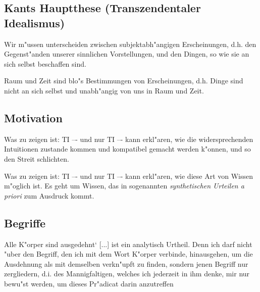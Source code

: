 \documentclass[emulatestandardclasses]{scrartcl}
\begin{document}
\subsection{Kants Hauptthese (Transzendentaler Idealismus)}

\begin{description}[leftmargin=!,labelwidth=\widthof{\bfseries ii}]
  \item[i] Wir m"ussen unterscheiden zwischen subjektabh"angigen Erscheinungen, d.h. den Gegenst"anden unserer sinnlichen Vorstellungen, und den Dingen, so wie sie an sich selbst beschaffen sind.
  \item[ii] Raum und Zeit sind blo"s Bestimmungen von Erscheinungen, d.h. Dinge sind nicht an sich selbst und unabh"angig von uns in Raum und Zeit.
\end{description}

\subsection{Motivation}

\begin{description}[leftmargin=!,labelwidth=\widthof{\bfseries Erkenntnistheorie}]
  \item[Metaphysik] Was zu zeigen ist: TI –- und nur TI –- kann erkl"aren, wie die widersprechenden Intuitionen zustande kommen und kompatibel gemacht werden k"onnen, und so den Streit schlichten.
  \item[Erkenntnistheorie] Was zu zeigen ist: TI –- und nur TI –- kann erkl"aren, wie diese Art von Wissen m"oglich ist. Es geht um Wissen, das in sogenannten \emph{synthetischen Urteilen a priori} zum Ausdruck kommt.
\end{description}


\subsection{Begriffe}

\begin{description}[leftmargin=!,labelwidth=\widthof{\bfseries ii}]
  \item[Was hei"st es, dass der Begriff des Unverheiratetseins in dem
des Junggesellen enthalten ist?] Alle K"orper sind ausgedehnt‘ [...] ist ein analytisch Urtheil. Denn ich darf nicht "uber den Begriff, den ich mit dem Wort K"orper verbinde, hinausgehen, um die Ausdehnung als mit demselben verkn"upft zu finden, sondern jenen Begriff nur zergliedern, d.i. des Mannigfaltigen, welches ich jederzeit in ihm denke, mir nur bewu"st werden, um dieses Pr"adicat darin anzutreffen
  \item[] 
\end{description}
\end{document}
